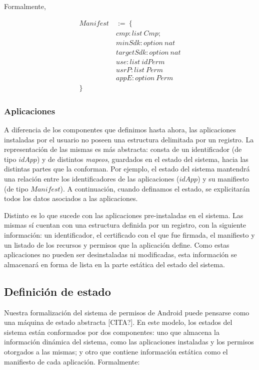 Formalmente,

\begin{align*}
    Manifest\  & :=\ \{                 \\
               & cmp: list\ Cmp;        \\
               & minSdk: option\ nat    \\
               & targetSdk: option\ nat \\
               & use: list\ idPerm      \\
               & usrP: list\ Perm       \\
               & appE: option\ Perm     \\
    \}
\end{align*}

\subsubsection*{Aplicaciones}
A diferencia de los componentes que definimos hasta ahora, las aplicaciones instaladas por el usuario no
poseen una estructura delimitada por un registro. La representación de las mismas es más abstracta:
consta de un identificador (de tipo $idApp$) y de distintos \textit{mapeos}, guardados en el estado del
sistema, hacia las distintas partes que la conforman. Por ejemplo, el estado del sistema mantendrá una
relación entre los identificadores de las aplicaciones ($idApp$) y su manifiesto (de tipo $Manifest$). A
continuación, cuando definamos el estado, se explicitarán todos los datos asociados a las aplicaciones.

Distinto es lo que sucede con las aplicaciones pre-instaladas en el sistema. Las mismas sí cuentan con
una estructura definida por un registro, con la siguiente información: un identificador, el certificado
con el que fue firmada, el manifiesto y un listado de los recursos y permisos que la aplicación define.
Como estas aplicaciones no pueden ser desinstaladas ni modificadas, esta información se almacenará en
forma de lista en la parte estática del estado del sistema.

\subsection{Definición de estado}
Nuestra formalización del sistema de permisos de Android puede pensarse como una máquina de estado
abstracta [CITA?]. En este modelo, los estados del sistema están conformados por dos componentes: uno
que almacena la información dinámica del sistema, como las aplicaciones instaladas y los permisos otorgados
a las mismas; y otro que contiene información estática como el manifiesto de cada aplicación. Formalmente:

